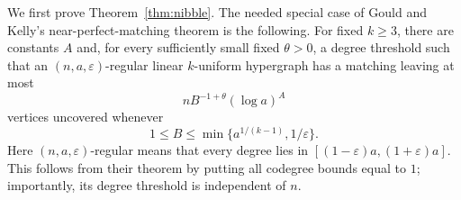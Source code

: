 \documentclass[10pt,a4paper]{amsart}
\begin{document}
We first prove Theorem~\ref{thm:nibble}. The needed special case of Gould and Kelly's
near-perfect-matching theorem \cite[Theorem 1.4]{GouldKelly} is the following. For fixed
$k\ge3$, there are constants $A$ and, for every sufficiently small fixed $\theta>0$, a
degree threshold such that an $(n,a,\varepsilon)$-regular linear $k$-uniform hypergraph
has a matching leaving at most
\begin{equation}
\label{eq:GK-leftover}
  n B^{-1+\theta}(\log a)^A
\end{equation}
vertices uncovered whenever
\[
  1\le B\le\min\{a^{1/(k-1)},1/\varepsilon\}.
\]
Here $(n,a,\varepsilon)$-regular means that every degree lies in
$[(1-\varepsilon)a,(1+\varepsilon)a]$. This follows from their theorem by putting all
codegree bounds equal to $1$; importantly, its degree threshold is independent of $n$.
\end{document}
